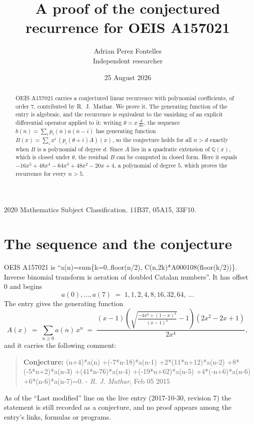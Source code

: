 \documentclass[11pt,a4paper]{article}
\title{A proof of the conjectured recurrence for OEIS A157021}
\author{Adrian Perez Fontelles\\ \small Independent researcher}
\date{25 August 2026}
\theoremstyle{plain}
\theoremstyle{definition}
\begin{document}
\maketitle

\begin{abstract}
OEIS A157021 carries a conjectured linear recurrence with polynomial coefficients, of
order 7, contributed by R.~J.~Mathar. We prove it. The generating function of the
entry is algebraic, and the recurrence is equivalent to the vanishing of an explicit
differential operator applied to it: writing $\theta=x\,\frac{d}{dx}$, the sequence
$b(n)=\sum_{i}p_{i}(n)a(n-i)$ has generating function
$B(x)=\sum_{i}x^{i}\,(p_{i}(\theta+i)A)(x)$, so the conjecture holds for all $n>d$ exactly
when $B$ is a polynomial of degree $d$. Since $A$ lies in a quadratic extension of
$\mathbb{Q}(x)$, which is closed under $\theta$, the residual $B$ can be computed in
closed form. Here it equals $- 16 x^{5} + 48 x^{4} - 64 x^{3} + 48 x^{2} - 20 x + 4$, a polynomial of degree $5$, which proves
the recurrence for every $n>5$.
\end{abstract}

\noindent\small 2020 Mathematics Subject Classification. 11B37, 05A15, 33F10.\normalsize

\section{The sequence and the conjecture}

OEIS A157021 is ``a(n)=sum\{k=0..floor(n/2), C(n,2k)*A000108(floor(k/2))\}. Inverse binomial transform is aeration of doubled Catalan numbers''. It has offset $0$ and begins
\[
a(0),\dots,a(7)\;=\;1, 1, 2, 4, 8, 16, 32, 64,\ \dots
\]
The entry gives the generating function
\begin{equation}\label{eq:gf}
A(x)\;=\;\sum_{n\ge 0} a(n)\,x^{n}\;=\;\frac{\left(x - 1\right) \left(\sqrt{\frac{- 4 x^{4} + \left(1 - x\right)^{4}}{\left(x - 1\right)^{4}}} - 1\right) \left(2 x^{2} - 2 x + 1\right)}{2 x^{4}} ,
\end{equation}
and it carries the following comment:
\begin{quote}\small
\textbf{Conjecture:} (n+4)*a(n) +(-7*n-18)*a(n-1) +2*(11*n+12)*a(n-2) +8*(-5*n+2)*a(n-3) +(41*n-76)*a(n-4) +(-19*n+62)*a(n-5) +4*(-n+6)*a(n-6) +6*(n-6)*a(n-7)=0. - \emph{R. J. Mathar}, Feb 05 2015
\end{quote}
As of the ``Last modified'' line on the live entry (2017-10-30, revision 7) the
statement is still recorded as a conjecture, and no proof appears among the entry's links,
formulas or programs.
\end{document}
